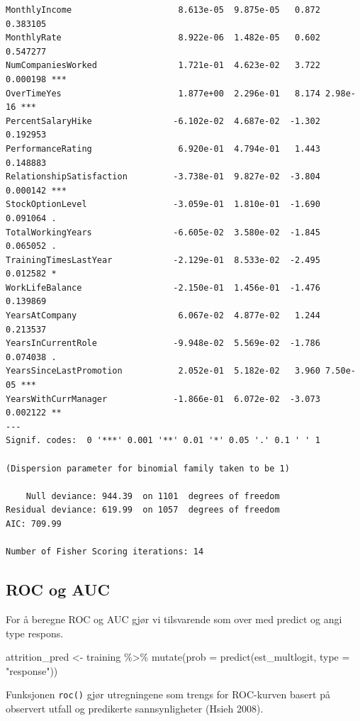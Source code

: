 \documentclass[
  letterpaper,
  DIV=11,
  numbers=noendperiod]{scrreprt}
\newenvironment{Shaded}{\begin{snugshade}}{\end{snugshade}}
\newcommand{\AttributeTok}[1]{\textcolor[rgb]{0.40,0.45,0.13}{#1}}
\newcommand{\FunctionTok}[1]{\textcolor[rgb]{0.28,0.35,0.67}{#1}}
\newcommand{\NormalTok}[1]{\textcolor[rgb]{0.00,0.23,0.31}{#1}}
\newcommand{\OtherTok}[1]{\textcolor[rgb]{0.00,0.23,0.31}{#1}}
\newcommand{\SpecialCharTok}[1]{\textcolor[rgb]{0.37,0.37,0.37}{#1}}
\newcommand{\StringTok}[1]{\textcolor[rgb]{0.13,0.47,0.30}{#1}}
\begin{document}
\begin{verbatim}
MonthlyIncome                     8.613e-05  9.875e-05   0.872 0.383105    
MonthlyRate                       8.922e-06  1.482e-05   0.602 0.547277    
NumCompaniesWorked                1.721e-01  4.623e-02   3.722 0.000198 ***
OverTimeYes                       1.877e+00  2.296e-01   8.174 2.98e-16 ***
PercentSalaryHike                -6.102e-02  4.687e-02  -1.302 0.192953    
PerformanceRating                 6.920e-01  4.794e-01   1.443 0.148883    
RelationshipSatisfaction         -3.738e-01  9.827e-02  -3.804 0.000142 ***
StockOptionLevel                 -3.059e-01  1.810e-01  -1.690 0.091064 .  
TotalWorkingYears                -6.605e-02  3.580e-02  -1.845 0.065052 .  
TrainingTimesLastYear            -2.129e-01  8.533e-02  -2.495 0.012582 *  
WorkLifeBalance                  -2.150e-01  1.456e-01  -1.476 0.139869    
YearsAtCompany                    6.067e-02  4.877e-02   1.244 0.213537    
YearsInCurrentRole               -9.948e-02  5.569e-02  -1.786 0.074038 .  
YearsSinceLastPromotion           2.052e-01  5.182e-02   3.960 7.50e-05 ***
YearsWithCurrManager             -1.866e-01  6.072e-02  -3.073 0.002122 ** 
---
Signif. codes:  0 '***' 0.001 '**' 0.01 '*' 0.05 '.' 0.1 ' ' 1

(Dispersion parameter for binomial family taken to be 1)

    Null deviance: 944.39  on 1101  degrees of freedom
Residual deviance: 619.99  on 1057  degrees of freedom
AIC: 709.99

Number of Fisher Scoring iterations: 14
\end{verbatim}

\subsection{ROC og AUC}\label{roc-og-auc-1}

For å beregne ROC og AUC gjør vi tilsvarende som over med predict og
angi type respons.

\begin{Shaded}
\begin{Highlighting}[]
\NormalTok{attrition\_pred }\OtherTok{\textless{}{-}}\NormalTok{ training }\SpecialCharTok{\%\textgreater{}\%}
  \FunctionTok{mutate}\NormalTok{(}\AttributeTok{prob =} \FunctionTok{predict}\NormalTok{(est\_multlogit, }\AttributeTok{type =} \StringTok{"response"}\NormalTok{))}
\end{Highlighting}
\end{Shaded}

Funksjonen \texttt{roc()} gjør utregningene som trengs for ROC-kurven
basert på observert utfall og predikerte sannsynligheter (Hsieh 2008).
\end{document}
